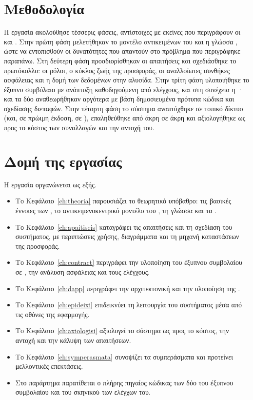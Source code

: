 \section{Μεθοδολογία}
\label{sec:methodologia}

Η εργασία ακολούθησε τέσσερις φάσεις, αντίστοιχες με εκείνες που περιγράφουν οι
\cite{papias2023} και \cite{hadjichristofi2022}. Στην πρώτη φάση μελετήθηκαν το μοντέλο
αντικειμένων του  και η γλώσσα , ώστε να εντοπισθούν οι δυνατότητες που
απαντούν στο πρόβλημα που περιγράφηκε παραπάνω.
Στη δεύτερη φάση προσδιορίσθηκαν οι απαιτήσεις και σχεδιάσθηκε το πρωτόκολλο: οι ρόλοι, ο
κύκλος ζωής της προσφοράς, οι αναλλοίωτες συνθήκες ασφάλειας και η δομή των δεδομένων στην
αλυσίδα. Στην τρίτη φάση υλοποιήθηκε το έξυπνο συμβόλαιο με ανάπτυξη καθοδηγούμενη από
ελέγχους, και στη συνέχεια η · και τα δύο αναθεωρήθηκαν αργότερα με βάση
δημοσιευμένα πρότυπα κώδικα και σχεδίασης διεπαφών. Στην τέταρτη φάση το σύστημα
αναπτύχθηκε σε τοπικό δίκτυο (και, σε πρώιμη έκδοση, σε ), επαληθεύθηκε από
άκρη σε άκρη και αξιολογήθηκε ως προς το κόστος των συναλλαγών και την αντοχή του.

\section{Δομή της εργασίας}
\label{sec:domi}

Η εργασία οργανώνεται ως εξής.

\begin{itemize}[nosep]
  \item Το Κεφάλαιο~\ref{ch:theoria} παρουσιάζει το θεωρητικό υπόβαθρο: τις βασικές
        έννοιες των , το αντικειμενοκεντρικό μοντέλο του , τη
        γλώσσα  και τα .
  \item Το Κεφάλαιο~\ref{ch:apaitiseis} καταγράφει τις απαιτήσεις και τη σχεδίαση του
        συστήματος, με περιπτώσεις χρήσης, διαγράμματα  και τη μηχανή καταστάσεων
        της προσφοράς.
  \item Το Κεφάλαιο~\ref{ch:contract} περιγράφει την υλοποίηση του έξυπνου συμβολαίου σε
        , την ανάλυση ασφάλειας και τους ελέγχους.
  \item Το Κεφάλαιο~\ref{ch:dapp} περιγράφει την αρχιτεκτονική και την υλοποίηση της
        .
  \item Το Κεφάλαιο~\ref{ch:epideixi} επιδεικνύει τη λειτουργία του συστήματος μέσα από
        τις οθόνες της εφαρμογής.
  \item Το Κεφάλαιο~\ref{ch:axiologisi} αξιολογεί το σύστημα ως προς το κόστος, την
        αντοχή και την κάλυψη των απαιτήσεων.
  \item Το Κεφάλαιο~\ref{ch:symperasmata} συνοψίζει τα συμπεράσματα και προτείνει
        μελλοντικές επεκτάσεις.
  \item Στο παράρτημα παρατίθεται ο πλήρης πηγαίος κώδικας των δύο  του
        έξυπνου συμβολαίου και του σκηνικού των ελέγχων του.
\end{itemize}
